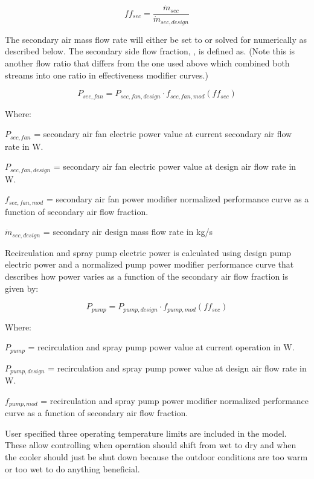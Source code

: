 \begin{equation}
ff_{sec} = \frac{\dot{m}_{sec}}{\dot{m}_{sec,design}}
\end{equation}

The secondary air mass flow rate will either be set to or solved for numerically as described below. The secondary side flow fraction, , is defined as. (Note this is another flow ratio that differs from the one used above which combined both streams into one ratio in effectiveness modifier curves.)

\begin{equation}
P_{sec,fan} = P_{sec,fan,design}\cdot f_{sec,fan,mod}\left(ff_{sec}\right)
\end{equation}

Where:

\(P_{sec,fan}\) = secondary air fan electric power value at current secondary air flow rate in W.

\(P_{sec,fan,design}\) = secondary air fan electric power value at design air flow rate in W.

\(f_{sec,fan,mod}\) = secondary air fan power modifier normalized performance curve as a function of secondary air flow fraction.

\(\dot{m}_{sec,design}\) = secondary air design mass flow rate in kg/s

Recirculation and spray pump electric power is calculated using design pump electric power and a normalized pump power modifier performance curve that describes how power varies as a function of the secondary air flow fraction is given by:

\begin{equation}
P_{pump} = P_{pump,design}\cdot f_{pump,mod}\left(ff_{sec}\right)
\end{equation}

Where:

\(P_{pump}\) = recirculation and spray pump power value at current operation in W.

\(P_{pump,design}\) = recirculation and spray pump power value at design air flow rate in W.

\(f_{pump,mod}\) = recirculation and spray pump power modifier normalized performance curve as a function of secondary air flow fraction.

User specified three operating temperature limits are included in the model. These allow controlling when operation should shift from wet to dry and when the cooler should just be shut down because the outdoor conditions are too warm or too wet to do anything beneficial.

